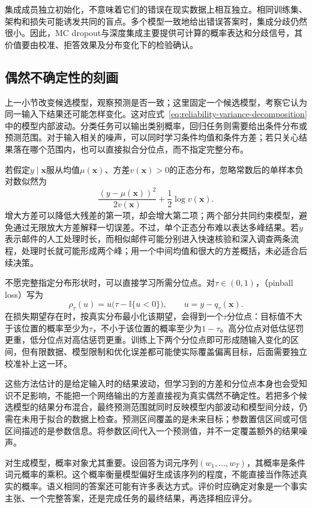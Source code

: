 集成成员独立初始化，不意味着它们的错误在现实数据上相互独立。相同训练集、架构和损失可能诱发共同的盲点。多个模型一致地给出错误答案时，集成分歧仍然很小。因此，MC dropout与深度集成主要提供可计算的概率表达和分歧信号，其价值要由校准、拒答效果及分布变化下的检验确认。

\subsection{偶然不确定性的刻画}
\label{sec:reliability-aleatoric-estimation}

上一小节改变候选模型，观察预测是否一致；这里固定一个候选模型，考察它认为同一输入下结果还可能怎样变化。这对应式~\eqref{eq:reliability-variance-decomposition}中的模型内部波动。分类任务可以输出类别概率，回归任务则需要给出条件分布或预测范围。对于输入相关的噪声，可以同时学习条件均值和条件方差；若只关心结果落在哪个范围内，也可以直接拟合分位点，而不指定完整分布。

若假定$y\mid\bm{x}$服从均值$\mu(\bm{x})$、方差$v(\bm{x})>0$的正态分布，忽略常数后的单样本负对数似然为
\[
 \frac{(y-\mu(\bm{x}))^2}{2v(\bm{x})}
       +\frac12\log v(\bm{x}).
\]
增大方差可以降低大残差的第一项，却会增大第二项；两个部分共同约束模型，避免通过无限放大方差解释一切误差。不过，单个正态分布难以表达多峰结果。若$y$表示邮件的人工处理时长，而相似邮件可能分别进入快速核验和深入调查两条流程，处理时长就可能形成两个峰；用一个中间均值和很大的方差概括，未必适合后续决策。

不愿完整指定分布形状时，可以直接学习所需分位点。对$\tau\in(0,1)$，（pinball loss）写为
\[
\rho_\tau(u)=u\bigl(\tau-\mathbb I\{u<0\}\bigr),
 \qquad u=y-q_\tau(\bm{x}).
\]
在损失期望存在时，按真实分布最小化该期望，会得到一个$\tau$分位点：目标值不大于该位置的概率至少为$\tau$，不小于该位置的概率至少为$1-\tau$。高分位点对低估惩罚更重，低分位点对高估惩罚更重。训练上下两个分位点即可形成随输入变化的区间，但有限数据、模型限制和优化误差都可能使实际覆盖偏离目标，后面需要独立校准补上这一环。

这些方法估计的是给定输入时的结果波动，但学习到的方差和分位点本身也会受知识不足影响，不能把一个网络输出的方差直接视为真实偶然不确定性。若把多个候选模型的结果分布混合，最终预测范围就同时反映模型内部波动和模型间分歧，仍需在未用于拟合的数据上检查。预测区间覆盖的是未来目标；参数置信区间或可信区间描述的是参数信息。将参数区间代入一个预测值，并不一定覆盖额外的结果噪声。

对生成模型，概率对象尤其重要。设回答为词元序列$(w_1,\ldots,w_T)$，其概率是条件词元概率的乘积。这个概率衡量模型偏好生成该序列的程度，不能直接当作陈述真实的概率。语义相同的答案还可能有许多表达方式。评价时应确定对象是一个事实主张、一个完整答案，还是完成任务的最终结果，再选择相应评分。

